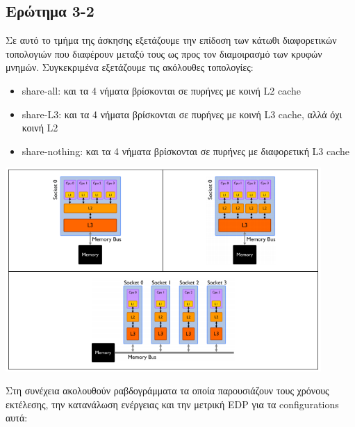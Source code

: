\subsection{Ερώτημα 3-2}

Σε αυτό το τμήμα της άσκησης εξετάζουμε την επίδοση των κάτωθι διαφορετικών
τοπολογιών που διαφέρουν μεταξύ τους ως προς τον διαμοιρασμό των κρυφών μνημών.
Συγκεκριμένα εξετάζουμε τις ακόλουθες τοπολογίες:

\begin{itemize}
   \item share-all: και τα 4 νήματα βρίσκονται σε πυρήνες με κοινή L2 cache
   \item share-L3: και τα 4 νήματα βρίσκονται σε πυρήνες με κοινή L3 cache, αλλά όχι κοινή L2
   \item share-nothing: και τα 4 νήματα βρίσκονται σε πυρήνες με διαφορετική L3 cache 
\end{itemize}

\begin{minipage}{\textwidth}
   \begin{center}
      \vspace{10mm}
      \includegraphics[width=0.9\textwidth]{./imgs/topologies.png}
      \vspace{6mm}
   \end{center}
\end{minipage}

\noindent Στη συνέχεια ακολουθούν ραβδογράμματα τα οποία παρουσιάζουν τους χρόνους
εκτέλεσης, την κατανάλωση ενέργειας και την μετρική EDP για τα configurations
αυτά:

